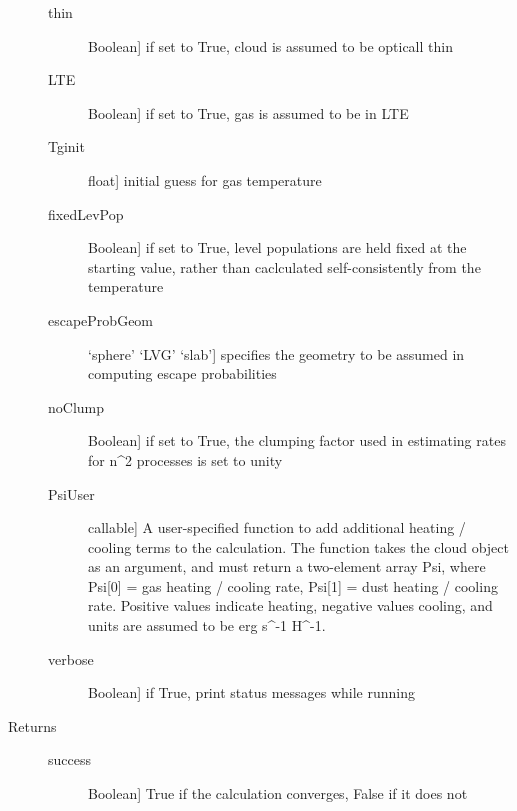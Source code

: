 \documentclass[letterpaper,10pt,english]{sphinxmanual}
\begin{document}
\begin{fulllineitems}
\begin{fulllineitems}
\begin{description}
\begin{description}
\item[{thin}] \leavevmode{[}Boolean{]}
if set to True, cloud is assumed to be opticall thin

\item[{LTE}] \leavevmode{[}Boolean{]}
if set to True, gas is assumed to be in LTE

\item[{Tginit}] \leavevmode{[}float{]}
initial guess for gas temperature

\item[{fixedLevPop}] \leavevmode{[}Boolean{]}
if set to True, level populations are held fixed
at the starting value, rather than caclculated
self-consistently from the temperature

\item[{escapeProbGeom}] \leavevmode{[}`sphere' \textbar{} `LVG' \textbar{} `slab'{]}
specifies the geometry to be assumed in computing escape
probabilities

\item[{noClump}] \leavevmode{[}Boolean{]}
if set to True, the clumping factor used in estimating
rates for n\textasciicircum{}2 processes is set to unity

\item[{PsiUser}] \leavevmode{[}callable{]}
A user-specified function to add additional heating /
cooling terms to the calculation. The function takes the
cloud object as an argument, and must return a two-element
array Psi, where Psi{[}0{]} = gas heating / cooling rate,
Psi{[}1{]} = dust heating / cooling rate. Positive values
indicate heating, negative values cooling, and units are
assumed to be erg s\textasciicircum{}-1 H\textasciicircum{}-1.

\item[{verbose}] \leavevmode{[}Boolean{]}
if True, print status messages while running

\end{description}

\item[{Returns}] \leavevmode\begin{description}
\item[{success}] \leavevmode{[}Boolean{]}
True if the calculation converges, False if it does not

\end{description}

\end{description}

\end{fulllineitems}


\end{fulllineitems}
\end{document}
